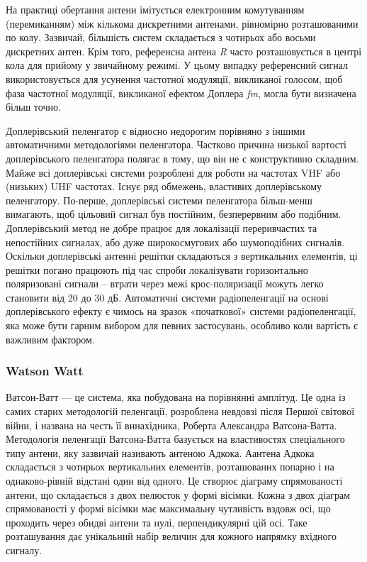 \documentclass{article}
\begin{document}
На практиці обертання антени імітується електронним комутуванням (перемиканням) між кількома дискретними антенами, рівномірно розташованими по колу. Зазвичай, більшість систем складається з чотирьох або восьми дискретних антен. Крім того, референсна антена \textit{R} часто розташовується в центрі кола для прийому у звичайному режимі. У цьому випадку референсний сигнал використовується для усунення частотної модуляції, викликаної голосом, щоб фаза частотної модуляції, викликаної ефектом Доплера \textit{fm}, могла бути визначена більш точно.

Доплерівський пеленгатор є відносно недорогим порівняно з іншими автоматичними методологіями пеленгатора. Частково причина низької вартості доплерівського пеленгатора полягає в тому, що він не є конструктивно складним. Майже всі доплерівські системи розроблені для роботи на частотах VHF або (низьких) UHF частотах. Існує ряд обмежень, властивих доплерівському пеленгатору. По-перше, доплерівські системи пеленгатора більш-менш вимагають, щоб цільовий сигнал був постійним, безперервним або подібним. Доплерівський метод не добре працює для локалізації переривчастих та непостійних сигналах, або дуже широкосмугових або шумоподібних сигналів. Оскільки доплерівські антенні решітки складаються з вертикальних елементів, ці решітки погано працюють під час спроби локалізувати горизонтально поляризовані сигнали – втрати через межі крос-поляризації можуть легко становити від 20 до 30 дБ. Автоматичні системи радіопеленгації на основі доплерівського ефекту є чимось на зразок «початкової» системи радіопеленгації, яка може бути гарним вибором для певних застосувань, особливо коли вартість є важливим фактором.

\subsubsection{Watson Watt}
Ватсон-Ватт — це система, яка побудована на порівнянні амплітуд. Це одна із самих старих методологій пеленгації, розроблена невдовзі після Першої світової війни, і названа на честь її винахідника, Роберта Александра Ватсона-Ватта. Методологія пеленгації Ватсона-Ватта базується на властивостях спеціального типу антени, яку зазвичай називають антеною Адкока. Аантена Адкока складається з чотирьох вертикальних елементів, розташованих попарно і на однаково-рівній відстані один від одного. Це створює діаграму спрямованості антени, що складається з двох пелюсток у формі вісімки. Кожна з двох діаграм спрямованості у формі вісімки має максимальну чутливість вздовж осі, що проходить через обидві антени та нулі, перпендикулярні цій осі. Таке розташування дає унікальний набір величин для кожного напрямку вхідного сигналу.
\end{document}
